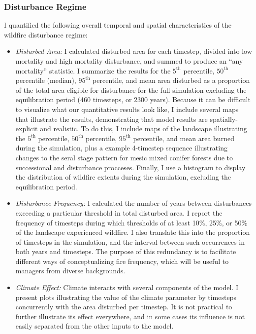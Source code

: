 \subsubsection*{Disturbance Regime} I quantified the following overall temporal and spatial characteristics of the wildfire disturbance regime:
\begin{itemize}
	\item \emph{Disturbed Area:} I calculated disturbed area for each timestep, divided into low mortality and high mortality disturbance, and summed to produce an ``any mortality'' statistic. I summarize the results for the $5^{\text{th}}$ percentile, $50^{\text{th}}$ percentile (median), $95^{\text{th}}$ percentile, and mean area disturbed as a proportion of the total area eligible for disturbance for the full simulation excluding the equilibration period (460 timesteps, or 2300 years). Because it can be difficult to visualize what our quantitative results look like, I include several maps that illustrate the results, demonstrating that model results are spatially-explicit and realistic. To do this, I include maps of the landscape illustrating the $5^{\text{th}}$ percentile, $50^{\text{th}}$ percentile, $95^{\text{th}}$ percentile, and mean area burned during the simulation, plus a example 4-timestep sequence illustrating changes to the seral stage pattern for mesic mixed conifer forests due to successional and disturbance procceses. Finally, I use a histogram to display the distribution of wildfire extents during the simulation, excluding the equilibration period.
	\item \emph{Disturbance Frequency:} I calculated the number of years between disturbances exceeding a particular threshold in total disturbed area. I report the frequency of timesteps during which thresholds of at least 10\%, 25\%, or 50\% of the landscape experienced wildfire. I also translate this into the proportion of timesteps in the simulation, and the interval between such occurrences in both years and timesteps. The purpose of this redundancy is to facilitate different ways of conceptualizing fire frequency, which will be useful to managers from diverse backgrounds.
	\item \emph{Climate Effect:} Climate interacts with several components of the model. I present plots illustrating the value of the climate parameter by timesteps concurrently with the area disturbed per timestep. It is not practical to further illustrate its effect everywhere, and in some cases its influence is not easily separated from the other inputs to the model. 

\end{itemize}
